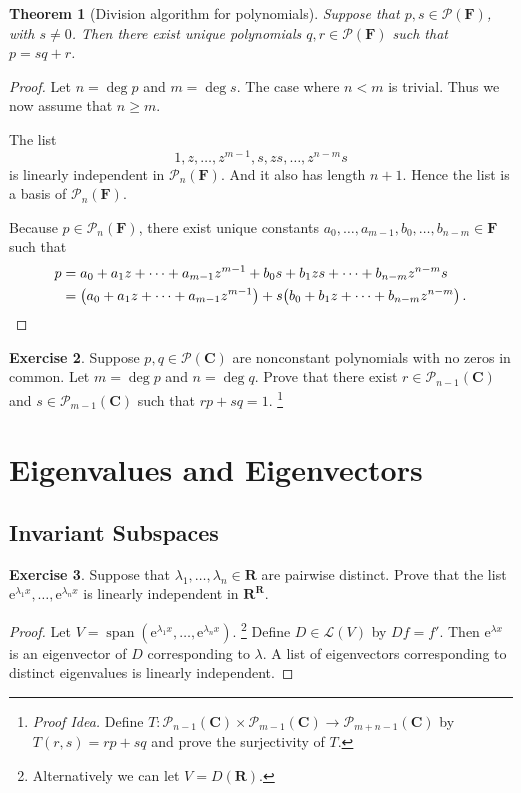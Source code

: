 \documentclass[nofonts,colorlinks]{tufte-handout}
\theoremstyle{plain} %
\newtheorem{thm}{Theorem}
\theoremstyle{definition}
\newtheorem{exer}[thm]{Exercise}
\theoremstyle{remark}
\def\idea{\textit{\color[rgb]{0,0,.55}Proof Idea. }}
\newcommand{\bra}[1]{\mathopen{}\left(#1\right)}
\newcommand{\R}{\mathbf{R}}
\newcommand{\C}{\mathbf{C}}
\newcommand{\F}{\mathbf{F}}
\renewcommand{\L}{\mathcal{L}}
\renewcommand{\P}{\mathcal{P}}
\newcommand{\e}{\mathrm{e}}
\DeclareMathOperator{\spn}{span}
\begin{document}
\begin{thm}[Division algorithm for polynomials]
	Suppose that $p,s\in\P(\F)$, with $s\neq0$. Then there exist unique polynomials $q,r\in\P(\F)$ such that $p=sq+r$.%
\end{thm}
\begin{proof}
	Let $n=\deg p$ and $m=\deg s$. The case where $n<m$ is trivial. Thus we now assume that $n\geq m$.

	The list
	\[1,z,\dots,z^{m-1},s,zs,\dots,z^{n-m}s\]
	is linearly independent in $\P_n(\F)$. And it also has length $n+1$. Hence the list is a basis of $\P_n(\F)$.

	Because $p\in\P_n(\F)$, there exist unique constants $a_0,\dots,a_{m-1},b_0,\dots,b_{n-m}\in\F$ such that
	\begin{align*}
		p&=a_0+a_1z+\dots+a_{m-1}z^{m-1}+b_0s+b_1zs+\dots+b_{n-m}z^{n-m}s\\
		&=\bra{a_0+a_1z+\dots+a_{m-1}z^{m-1}}+s\bra{b_0+b_1z+\dots+b_{n-m}z^{n-m}}.\qedhere
	\end{align*}
\end{proof}

\begin{exer}
	Suppose $p,q\in\P(\C)$ are nonconstant polynomials with no zeros in common. Let $m=\deg p$ and $n=\deg q$. Prove that there exist $r\in\P_{n-1}(\C)$ and $s\in\P_{m-1}(\C)$ such that $rp+sq=1$.%
	\footnote{\idea Define $T:\P_{n-1}(\C)\times\P_{m-1}(\C)\to\P_{m+n-1}(\C)$ by $T(r,s)=rp+sq$ and prove the surjectivity of $T$.}
\end{exer}


\section{Eigenvalues and Eigenvectors}
\subsection{Invariant Subspaces}
\begin{exer}
	Suppose that $\lambda_1,\dots,\lambda_n\in\R$ are pairwise distinct. Prove that the list $\e^{\lambda_1x},\dots,\e^{\lambda_nx}$ is linearly independent in $\R^{\R}$.
\end{exer}
\begin{proof}
	Let $V=\spn(\e^{\lambda_1x},\dots,\e^{\lambda_nx})$.%
	\footnote{Alternatively we can let $V=D(\R)$.}
	Define $D\in\L(V)$ by $Df=f'$. Then $\e^{\lambda x}$ is an eigenvector of $D$ corresponding to $\lambda$. A list of eigenvectors corresponding to distinct eigenvalues is linearly independent.
\end{proof}
\end{document}
